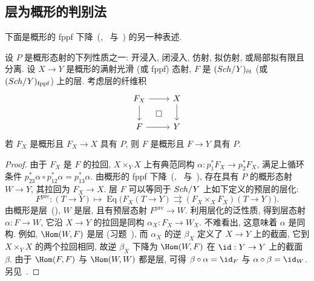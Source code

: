 \subsection{层为概形的判别法}\label{src:3.3.4-subsection}
下面是概形的 fppf 下降~(, ~与~) 的另一种表述.
\begin{proposition}\label{src:3.3.17}
设 $P$ 是概形态射的下列性质之一: 开浸入, 闭浸入, 仿射, 拟仿射, 或局部拟有限且分离. 设 $X\to Y$ 是概形的满射光滑 (或 fppf) 态射, $F$ 是 $(Sch/Y)_{\text{ét}}$ (或 $(Sch/Y)_{\mathrm{fppf}}$) 上的层. 考虑层的纤维积
\[
\begin{tikzcd}
F_X\arrow[r]\arrow[d]\arrow[dr,phantom,"\square"]&X\arrow[d]\\
F\arrow[r]&Y
\end{tikzcd}
\]
若 $F_X$ 是概形且 $F_X\to X$ 具有 $P$, 则 $F$ 是概形且 $F\to Y$ 具有 $P$.
\end{proposition}
\begin{proof}
由于 $F_X$ 是 $F$ 的拉回, $X\times_Y X$ 上有典范同构 $\alpha:p_1^*F_X\to p_2^*F_X$, 满足上循环条件 $p_{23}^*\alpha\circ p_{12}^*\alpha=p_{13}^*\alpha$. 由概形的 fppf 下降~(, ~与~), 存在具有 $P$ 的概形态射 $W\to Y$, 其拉回为 $F_X\to X$.
层 $F$ 可以等同于 $Sch/Y$ 上如下定义的预层的层化:
\[
F^{\mathrm{pre}}:(T\to Y)\longmapsto
\operatorname{Eq}\bigl(F_X(T\to Y)\rightrightarrows
(F_X\times_X F_X)(T\to Y)\bigr).
\]
由概形是层~(), $W$ 是层, 且有预层态射 $F^{\mathrm{pre}}\to W$. 利用层化的泛性质, 得到层态射 $\alpha:F\to W$, 它沿 $X\to Y$ 的拉回是同构 $\alpha_X:F_X\to W_X$.
不难看出, 这意味着 $\alpha$ 是同构. 例如, $\Hom(W,F)$ 是层 (习题~), 而 $\alpha_X$ 的逆 $\beta_X$ 定义了 $X\to Y$ 上的截面, 它到 $X\times_Y X$ 的两个拉回相同, 故逆 $\beta_X$ 下降为 $\Hom(W,F)$ 在 $\id:Y\to Y$ 上的截面 $\beta$. 由于 $\Hom(F,F)$ 与 $\Hom(W,W)$ 都是层, 可得 $\beta\circ\alpha=\id_F$ 与 $\alpha\circ\beta=\id_W$. 另见~\cite[Tag 02W5]{SP}.
\end{proof}
